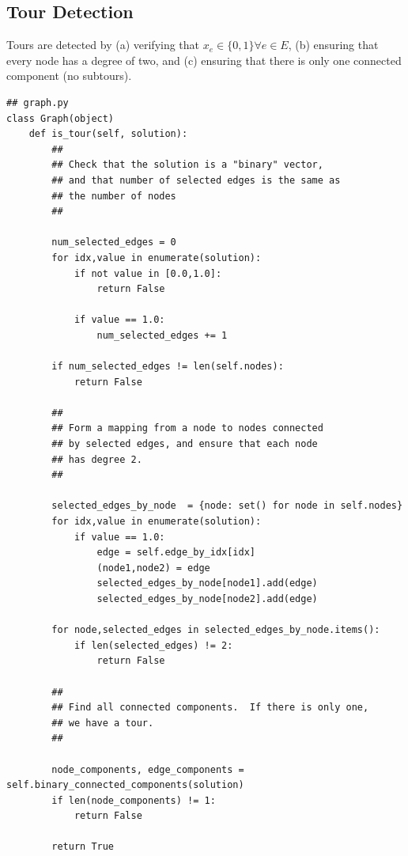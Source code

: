 \documentclass{article}
\begin{document}
\subsection{Tour Detection}
\begin{flushleft}
Tours are detected by
(a) verifying that $x_e \in \{0,1\} \forall e \in E$,
(b) ensuring that every node has a degree of two, and
(c) ensuring that there is only one connected component (no subtours).

\begin{lstlisting}
## graph.py
class Graph(object)
    def is_tour(self, solution):
        ##
        ## Check that the solution is a "binary" vector,
        ## and that number of selected edges is the same as
        ## the number of nodes
        ##

        num_selected_edges = 0
        for idx,value in enumerate(solution):
            if not value in [0.0,1.0]:
                return False

            if value == 1.0:
                num_selected_edges += 1

        if num_selected_edges != len(self.nodes):
            return False

        ##
        ## Form a mapping from a node to nodes connected
        ## by selected edges, and ensure that each node
        ## has degree 2.
        ##

        selected_edges_by_node  = {node: set() for node in self.nodes}
        for idx,value in enumerate(solution):
            if value == 1.0:
                edge = self.edge_by_idx[idx]
                (node1,node2) = edge
                selected_edges_by_node[node1].add(edge)
                selected_edges_by_node[node2].add(edge)

        for node,selected_edges in selected_edges_by_node.items():
            if len(selected_edges) != 2:
                return False

        ##
        ## Find all connected components.  If there is only one,
        ## we have a tour.
        ##

        node_components, edge_components = self.binary_connected_components(solution)
        if len(node_components) != 1:
            return False

        return True
\end{lstlisting}

\end{flushleft}
\end{document}
